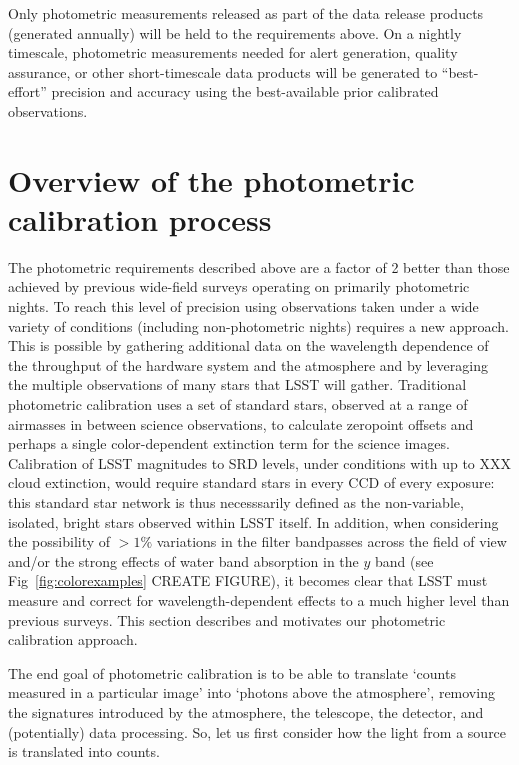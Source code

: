 \documentclass[12pt,preprint]{aastex}
\begin{document}
Only photometric measurements released as part of the data release
products (generated annually) will be held to the requirements
above. On a nightly timescale, photometric measurements needed for
alert generation, quality assurance, or other short-timescale data
products will be generated to ``best-effort'' precision and accuracy
using the best-available prior calibrated observations.

\section{Overview of the photometric calibration process}

The photometric requirements described above are a factor of 2 better
than those achieved by previous wide-field surveys operating on
primarily photometric nights. To reach this level of precision using
observations taken under a wide variety of conditions (including
non-photometric nights) requires a new approach. This is possible by
gathering additional data on the wavelength dependence of the
throughput of the hardware system and the atmosphere and by leveraging
the multiple observations of many stars that LSST will
gather. Traditional photometric calibration uses a set of standard
stars, observed at a range of airmasses in between science
observations, to calculate zeropoint offsets and perhaps a single
color-dependent extinction term for the science images. Calibration of
LSST magnitudes to SRD levels, under conditions with up to XXX cloud
extinction, would require standard stars in every CCD of every
exposure: this standard star network is thus necesssarily defined as the
non-variable, isolated, bright stars observed within LSST itself. In
addition, when considering the possibility of $>1\%$ variations in the
filter bandpasses across the field of view and/or the strong effects
of water band absorption in the $y$ band (see
Fig~\ref{fig:colorexamples} CREATE FIGURE), it becomes clear that LSST
must measure and correct for wavelength-dependent effects to a much
higher level than previous surveys. This section describes and motivates our
photometric calibration approach. 

The end goal of photometric calibration is to be able to translate
`counts measured in a particular image' into `photons above the
atmosphere', removing the signatures introduced by the atmosphere, the
telescope, the detector, and (potentially) data processing. So, let us
first consider how the light from a source is translated into
counts. 
\end{document}
